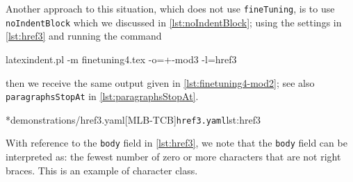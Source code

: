 \begin{example}
	 Another approach to this situation, which does not use \texttt{fineTuning}, is to use \texttt{noIndentBlock}
	 which we discussed in \vref{lst:noIndentBlock};
	 using the settings in \cref{lst:href3} and running the command
	 \begin{commandshell}
latexindent.pl -m finetuning4.tex -o=+-mod3 -l=href3
\end{commandshell}
	 then we receive the same output given in \cref{lst:finetuning4-mod2}; see also \texttt{paragraphsStopAt}
	 in \vref{lst:paragraphsStopAt}.

	 \cmhlistingsfromfile*[style=yaml-LST]*{demonstrations/href3.yaml}[MLB-TCB]{\texttt{href3.yaml}}{lst:href3}

   With reference to the \texttt{body} field in \cref{lst:href3}, we note that the \texttt{body} field can
	 be interpreted as: the fewest number of zero or more characters that are not right braces. This
	 is an example of character class.
 \end{example}
